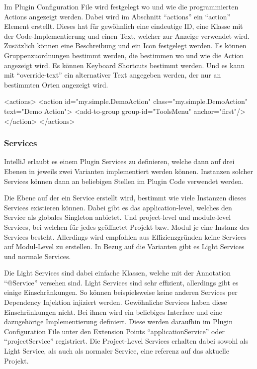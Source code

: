   Im Plugin Configuration File wird festgelegt wo und wie die programmierten Actions angezeigt
  werden. Dabei wird im Abschnitt \enquote{actions} ein \enquote{action} Element erstellt.
  Dieses hat für gewöhnlich eine eindeutige ID, eine Klasse mit der Code-Implementierung und
  einen Text, welcher zur Anzeige verwendet wird. Zusätzlich können eine Beschreibung und
  ein Icon festgelegt werden. Es können Gruppenzuordnungen bestimmt werden, die bestimmen
  wo und wie die Action angezeigt wird. Es können Keyboard Shortcuts bestimmt werden. Und
  es kann mit \enquote{override-text} ein alternativer Text angegeben werden, der nur an
  bestimmten Orten angezeigt wird.
  
  \begin{XmlCode}
    <actions>
        <action id="my.simple.DemoAction"
                class="my.simple.DemoAction" 
                text="Demo Action">
            <add-to-group group-id="ToolsMenu" anchor="first"/>
        </action>
    </actions>
  \end{XmlCode}

\subsubsection{Services}
  IntelliJ erlaubt es einem Plugin Services zu definieren, welche dann auf drei Ebenen
  in jeweils zwei Varianten implementiert werden können. Instanzen solcher Services können
  dann an beliebigen Stellen im Plugin Code verwendet werden.

  Die Ebene auf der ein Service erstellt wird, bestimmt wie viele Instanzen dieses 
  Services existieren können. Dabei gibt es das application-level, welches den Service
  als globales Singleton anbietet. Und project-level und module-level Services, bei welchen
  für jedes geöffnetet Projekt bzw. Modul je eine Instanz des Services besteht. Allerdings 
  wird empfohlen aus Effizienzgründen keine Services auf Modul-Level zu erstellen.
  In Bezug auf die Varianten gibt es Light Services und normale Services.

  Die Light Services sind dabei einfache Klassen, welche mit der Annotation \enquote{@Service}
  versehen sind. Light Services sind sehr effizient, allerdings gibt es einige Einschränkungen.
  So können beispielsweise keine anderen Services per Dependency Injektion injiziert werden.
  Gewöhnliche Services haben diese Einschränkungen nicht. Bei ihnen wird ein beliebiges Interface und
  eine dazugehörige Implementierung definiert. Diese werden daraufhin im Plugin Configuration File
  unter den Extension Points \enquote{applicationService} oder \enquote{projectService} registriert.
  Die Project-Level Services erhalten dabei sowohl als Light Service, als auch als normaler Service, 
  eine referenz auf das aktuelle Projekt.

